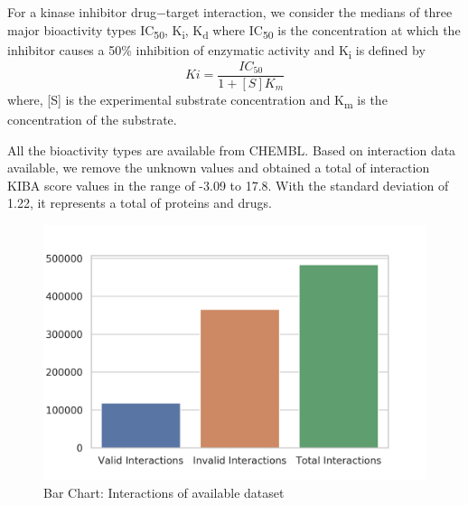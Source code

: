 For a kinase inhibitor drug−target interaction, we consider the medians of three major bioactivity types IC\textsubscript{50}, K\textsubscript{i}, K\textsubscript{d} where
IC\textsubscript{50} \citep{Tang2013} is the concentration at which the inhibitor causes a 50\% inhibition of enzymatic activity and K\textsubscript{i} is defined by \begin{equation}
    Ki = \frac{IC_{50}} {1 + [S]  K_m}
    \label{eq:ki}
\end{equation} 
where,  [{S}] is the experimental substrate concentration and K\textsubscript{m} is the concentration of the substrate.

All the bioactivity types are available from CHEMBL\citep{Gaulton2017}. Based on interaction data available, we remove the unknown values and obtained a total of  interaction KIBA score values in the range of -3.09 to 17.8. With the standard deviation of 1.22, it represents a total of  proteins and  drugs.

\begin{figure}
  \label{fig:interactions_summary}
  \centering
  \includegraphics[width=.7\textwidth]{dataset/images/interactions_summary.png}
  \caption{Bar Chart: Interactions of available dataset}
\end{figure}
